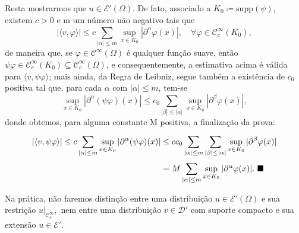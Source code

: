 \documentclass[../distribution_theory_notes.tex]{subfiles}
\begin{document}
\begin{proof*}
	Resta mostrarmos que \(u\in \mathcal{E}'(\Omega )\). De fato, associado a \(K_{0}\coloneqq \mathrm{supp}(\psi )\), existem \(c>0\) e m um número não negativo tais que
	\[
		| \langle v, \varphi  \rangle | \leq c \sum\limits_{| \alpha  |\leq m}^{}\sup_{x\in K_{0}}| \partial^{\alpha }\varphi (x) |, \quad \forall \varphi \in \mathcal{C}_{c}^{\infty}(K_{0}),
	\]
	de maneira que, se \(\varphi \in \mathcal{C}^{\infty}(\Omega )\) é qualquer função suave, então \(\psi \varphi\in \mathcal{C}_{c}^{\infty}(K_{0})\subseteq \mathcal{C}_{c}^{\infty}(\Omega ) \), e consequentemente, a estimativa acima é válida para \(\langle v, \psi \varphi  \rangle\); mais ainda, da Regra de Leibniz, segue também a existência de \(c_{0}\) positiva tal que, para cada \(\alpha \) com \(| \alpha  |\leq m\), tem-se
	\[
		\sup_{x\in K_{0}}| \partial^{\alpha }(\psi \varphi )(x) |\leq c_{0}\sum\limits_{| \beta  |\leq | \alpha  |}^{}\sup_{x\in K_{0}}| \partial^{\beta }\varphi (x) |,
	\]
	donde obtemos, para alguma constante M positiva, a finalização da prova:
	\begin{align*}
		| \langle v, \psi \varphi  \rangle | \leq c \sum\limits_{| \alpha  |\leq m}^{}\sup_{x\in K_{0}}| \partial^{\alpha }(\psi \varphi )(x) | & \leq cc_{0}\sum\limits_{| \alpha  |\leq m}^{}\sum\limits_{| \beta  |\leq | \alpha  |}^{}\sup_{x\in K_{0}}| \partial^{\beta }\varphi (x) | \\
		                                                                                                                                        & = M \sum\limits_{| \alpha  |\leq m}^{}\sup_{x\in K_{0}}| \partial^{\alpha }\varphi (x) |. \text{ $\blacksquare$}
	\end{align*}
\end{proof*}
Na prática, não faremos distinção entre uma distribuição \(u\in \mathcal{E}'(\Omega )\) e sua restrição \(u|_{\mathcal{C}_{c}^{\infty}},\) nem entre uma distribuição \(v\in \mathcal{D}'\) com suporte compacto e sua extensão \(u\in \mathcal{E}'\).
\end{document}
